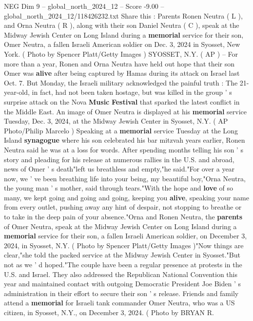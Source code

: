 \begin{textsample}{NEG Dim 9 – global\_north\_2024\_12 – Score -9.00 – global\_north\_2024\_12/118426232.txt}  \label{ex:f9_neg_113}
Share this : Parents Ronen Neutra ( L ), and Orna Neutra ( R ), along with their son Daniel Neutra ( C ), speak at the Midway Jewish Center on Long Island during a \textbf{memorial} service for their son, Omer Neutra, a fallen Israeli American soldier on Dec. 3, 2024 in Syosset, New York. ( Photo by Spencer Platt/Getty Images ) SYOSSET, N.Y. ( AP ) -- For more than a year, Ronen and Orna Neutra have held out hope that their son Omer was \textbf{alive} after being captured by Hamas during its attack on Israel last Oct. 7.
But Monday, the Israeli military acknowledged the painful truth : The 21-year-old, in fact, had not been taken hostage, but was killed in the group ' s surprise attack on the Nova \textbf{Music} \textbf{Festival} that sparked the latest conflict in the Middle East.
An image of Omer Neutra is displayed at his \textbf{memorial} service Tuesday, Dec. 3, 2024, at the Midway Jewish Center in Syosset, N.Y. ( AP Photo/Philip Marcelo ) Speaking at a \textbf{memorial} service Tuesday at the Long Island \textbf{synagogue} where his son celebrated his bar mitzvah years earlier, Ronen Neutra said he was at a loss for words.
After spending months telling his son ' s story and pleading for his release at numerous rallies in the U.S. and abroad, news of Omer ' s death"left us breathless and empty,"he said."For over a year now, we ' ve been breathing life into your being, my beautiful boy,"Orna Neutra, the young man ' s mother, said through tears."With the hope and \textbf{love} of so many, we kept going and going and going, keeping you \textbf{alive}, speaking your name from every outlet, pushing away any hint of despair, not stopping to breathe or to take in the deep pain of your absence."Orna and Ronen Neutra, the \textbf{parents} of Omer Neutra, speak at the Midway Jewish Center on Long Island during a \textbf{memorial} service for their son, a fallen Israeli American soldier, on December 3, 2024, in Syosset, N.Y. ( Photo by Spencer Platt/Getty Images )"Now things are clear,"she told the packed service at the Midway Jewish Center in Syosset."But not as we ' d hoped."The couple have been a regular presence at protests in the U.S. and Israel.
They also addressed the Republican National Convention this year and maintained contact with outgoing Democratic President Joe Biden ' s administration in their effort to secure their son ' s release.
Friends and family attend a \textbf{memorial} for Israeli tank commander Omer Neutra, who was a US citizen, in Syosset, N.Y., on December 3, 2024. ( Photo by BRYAN R.

\end{textsample}
